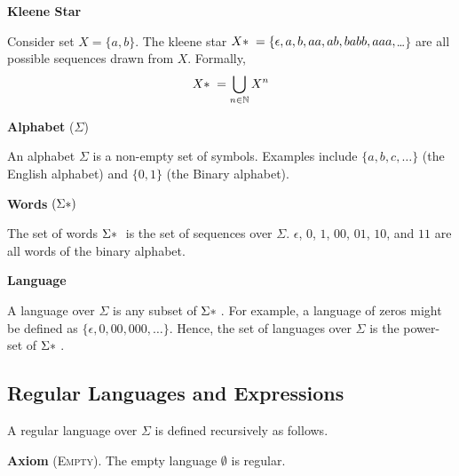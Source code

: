 \begin{minipage}[t]{0.2\textwidth}
    \textbf{\textsf{Kleene Star}}
\end{minipage}%
\begin{minipage}[t]{0.8\textwidth}
Consider set $X = \{a, b\}$. The kleene star $X \* = \{\epsilon, a, b, aa, ab, ba bb, aaa, $\ldots$\}$ are all possible sequences drawn from $X$. Formally,
\[X\* = \bigcup_{n \in \mathbb{N}} X^n\]
\end{minipage}\par

\begin{minipage}[t]{0.2\textwidth}
    \textbf{\textsf{Alphabet}} ($\Sigma$)
\end{minipage}%
\begin{minipage}[t]{0.8\textwidth}
An alphabet $\Sigma$ is a non-empty set of symbols. Examples include $\{ a, b, c, \ldots \}$ (the English alphabet) and $\{ 0, 1 \}$ (the Binary alphabet).
\end{minipage}\par

\begin{minipage}[t]{0.2\textwidth}
    \textbf{\textsf{Words}} $(\Sigma \*)$
\end{minipage}%
\begin{minipage}[t]{0.8\textwidth}
The set of words $\Sigma \*$ is the set of sequences over $\Sigma$. $\epsilon$, $0$, $1$, $00$, $01$, $10$, and $11$ are all words of the binary alphabet.
\end{minipage}\par

\begin{minipage}[t]{0.2\textwidth}
    \textbf{\textsf{Language}}
\end{minipage}%
\begin{minipage}[t]{0.8\textwidth}
A language over $\Sigma$ is any subset of $\Sigma\*$. For example, a language of zeros might be defined as $\{ \epsilon, 0, 00, 000, \ldots \}$. Hence, the set of languages over $\Sigma$ is the power-set of $\Sigma\*$. 
\end{minipage}

\subsection{Regular Languages and Expressions}
A regular language over $\Sigma$ is defined recursively as follows. 

\textsf{\textbf{Axiom}} \textsc{(Empty)}. The empty language $\emptyset$ is regular.


